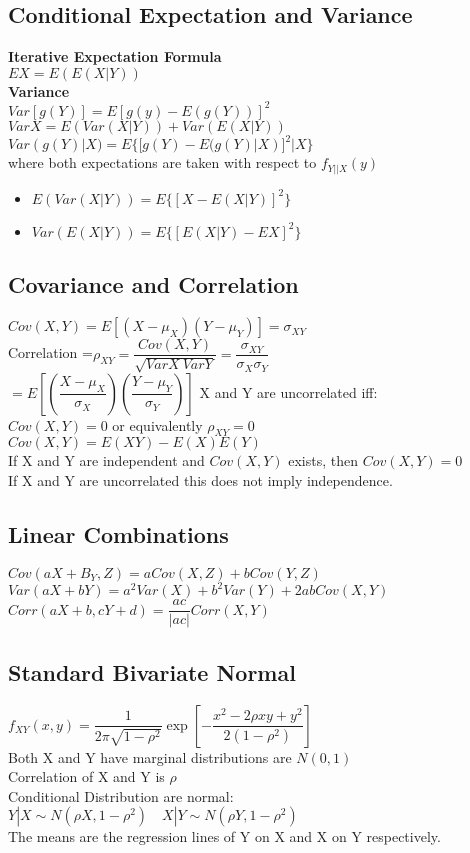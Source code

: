 \documentclass{article}
\begin{document}
\begin{flushleft}
\subsection*{Conditional Expectation and Variance}
\textbf{Iterative Expectation Formula}\\
$EX=E(E(X|Y))$\\
\textbf{Variance}\\
$Var[g(Y)]=E[g(y)-E(g(Y))]^2$\medbreak
$VarX=E(Var(X|Y))+Var(E(X|Y))$\\
$Var(g(Y)|X)=E\{[g(Y)-E(g(Y)|X)]^2|X\}$\\
where both expectations are taken with respect to $f_{Y||X}(y)$\\
\begin{itemize}
\item $E(Var(X|Y))=E\{[X-E(X|Y)]^2\}$\\
\item $Var(E(X|Y))=E\{[E(X|Y)-EX]^2\}$\\
\end{itemize}
\subsection*{Covariance and Correlation}
$Cov(X,Y)=E[(X-\mu_X)(Y-\mu_Y)]=\sigma_{XY}$\\
Correlation =$\rho_{XY}=\dfrac{Cov(X,Y)}{\sqrt{VarX \ VarY}}=\dfrac{\sigma_{XY}}{\sigma_X \sigma_Y}$\\
$=E\left[ \left( \dfrac{X-\mu_X}{\sigma_X} \right) \left( \dfrac{Y-\mu_Y}{\sigma_Y} \right) \right]$\medbreak
X and Y are uncorrelated iff:\\
$Cov(X,Y)=0$ or equivalently $\rho_{XY}=0$\\
$Cov(X,Y)=E(XY)-E(X)E(Y)$\\
If X and Y are independent and $Cov(X,Y)$ exists, then $Cov(X,Y)=0$\\
If X and Y are uncorrelated this does not imply independence.\\
\subsection*{Linear Combinations}
$Cov(aX+B_Y,Z)=aCov(X,Z)+bCov(Y,Z)$\medbreak
$Var(aX+bY)=a^2Var(X)+b^2Var(Y)+2abCov(X,Y)$\medbreak
$Corr(aX+b,cY+d)=\dfrac{ac}{|ac|}Corr(X,Y)$

\subsection*{Standard Bivariate Normal}
$f_{XY}(x,y)=\dfrac{1}{2\pi\sqrt{1-\rho^2}}\exp{\left[-\dfrac{x^2-2\rho xy+y^2}{2(1-\rho^2)}\right]}$\\
Both X and Y have marginal distributions are $N(0,1)$\\
Correlation of X and Y is $\rho$\\
Conditional Distribution are normal:\\
$Y|X \sim N(\rho X,1-\rho^2) \quad X|Y \sim N(\rho Y, 1-\rho^2)$\\
The means are the regression lines of Y on X and X on Y respectively.

\end{flushleft}
\end{document}
